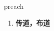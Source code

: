 
\begin{frame}
{\huge preach}
\begin{center}
\begin{enumerate}\Large
  \item \textbf{传道，布道}
\end{enumerate}
\end{center}
\end{frame}
